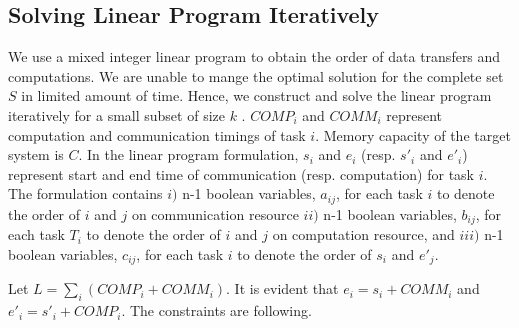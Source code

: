 \documentclass[sigconf]{acmart}
\begin{document}
	\subsection{Solving Linear Program Iteratively}
	\label{subsec:linearprogrammingformulation}
	We use a mixed integer linear program  to obtain the order of data transfers and computations. We are unable to mange the optimal solution for the complete set $S$ in limited amount of time.  Hence, we construct and solve the linear program iteratively for a small subset of size $k$ . $COMP_i$ and $COMM_i$ represent computation and communication timings of task $i$. Memory capacity of the  target system is $C$. In the linear program formulation, $s_i$ and $e_i$ (resp. $s'_i$ and $e'_i$) represent start and end time of communication (resp. computation) for task $i$. The formulation contains $i)$ n-1 boolean variables, $a_{ij}$, for each task $i$ to denote the order of $i$ and $j$  on communication resource   $ii)$ n-1 boolean variables, $b_{ij}$, for each task $T_i$ to denote the order of $i$ and $j$  on computation resource, and $iii)$ n-1 boolean variables, $c_{ij}$, for each task $i$ to denote the order of $s_i$ and $e'_j$.
	
	
	
	
	
	
	\noindent Let $L=\sum_i (COMP_i + COMM_i)$. It is evident that $e_i =s_i + COMM_i$ and $e'_i =s'_i + COMP_i$. The constraints are following.
	
\end{document}
